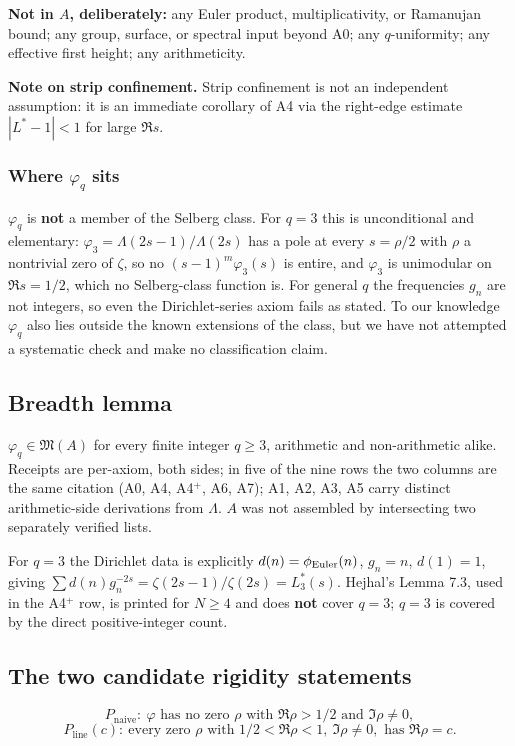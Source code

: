 \documentclass[11pt]{amsart}
\theoremstyle{remark}
\begin{document}
\textbf{Not in $A$, deliberately:} any Euler product, multiplicativity,
or Ramanujan bound; any group, surface, or spectral input beyond A0; any
$q$-uniformity; any effective first height; any arithmeticity.

\textbf{Note on strip confinement.} Strip confinement is not an
independent assumption: it is an immediate corollary of A4 via the
right-edge estimate $|L^*-1|<1$ for large $\Re s$.

\subsubsection{Where $\varphi_q$ sits}

$\varphi_q$ is \textbf{not} a member of the Selberg class. For $q=3$
this is unconditional and elementary: $\varphi_3=\Lambda(2s-1)/\Lambda(2s)$
has a pole at every $s=\rho/2$ with $\rho$ a nontrivial zero of $\zeta$,
so no $(s-1)^m\varphi_3(s)$ is entire, and $\varphi_3$ is unimodular on
$\Re s=1/2$, which no Selberg-class function is. For general $q$ the
frequencies $g_n$ are not integers, so even the Dirichlet-series axiom
fails as stated. To our knowledge $\varphi_q$ also lies outside the
known extensions of the class, but we have not attempted a systematic
check and make no classification claim.

\subsection{Breadth lemma}

$\varphi_q\in\mathfrak M(A)$ for every finite integer $q\ge3$, arithmetic
and non-arithmetic alike. Receipts are per-axiom, both sides; in five of
the nine rows the two columns are the same citation (A0, A4, A4$^+$, A6,
A7); A1, A2, A3, A5 carry distinct arithmetic-side derivations from
$\Lambda$. $A$ was not assembled by intersecting two separately verified
lists.

For $q=3$ the Dirichlet data is explicitly $d(n)=\phi_{\rm Euler}(n)$,
$g_n=n$, $d(1)=1$, giving
$\sum d(n)g_n^{-2s}=\zeta(2s-1)/\zeta(2s)=L^*_3(s)$. Hejhal's Lemma 7.3,
used in the A4$^+$ row, is printed for $N\ge4$ and does \textbf{not}
cover $q=3$; $q=3$ is covered by the direct positive-integer count.

\subsection{The two candidate rigidity statements}

\[
P_{\mathrm{naive}}: \ \varphi \text{ has no zero } \rho \text{ with }
\Re\rho>1/2 \text{ and } \Im\rho\neq0,
\]
\[
P_{\mathrm{line}}(c): \ \text{every zero } \rho \text{ with }
1/2<\Re\rho<1,\ \Im\rho\neq0, \text{ has } \Re\rho=c.
\]
\end{document}
